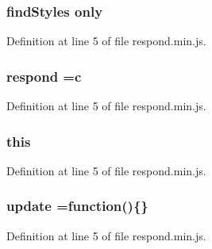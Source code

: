 \subsubsection[{only}]{\setlength{\rightskip}{0pt plus 5cm}find\+Styles only}\label{respond_8min_8js_a2174be31dfda10d6840a95fec477b47a}


Definition at line 5 of file respond.\+min.\+js.

\subsubsection[{respond}]{ respond ={\bf c}}\label{respond_8min_8js_a9997c75bd5f535000b1f1694f2d910ee}


Definition at line 5 of file respond.\+min.\+js.

\subsubsection[{this}]{\setlength{\rightskip}{0pt plus 5cm}this}\label{respond_8min_8js_a05c09a5e9d53fa7adf0a7936038c2fa3}


Definition at line 5 of file respond.\+min.\+js.

\subsubsection[{update}]{ update =function()\{\}}\label{respond_8min_8js_a142fa848153aad029e08d479f6362d80}


Definition at line 5 of file respond.\+min.\+js.

